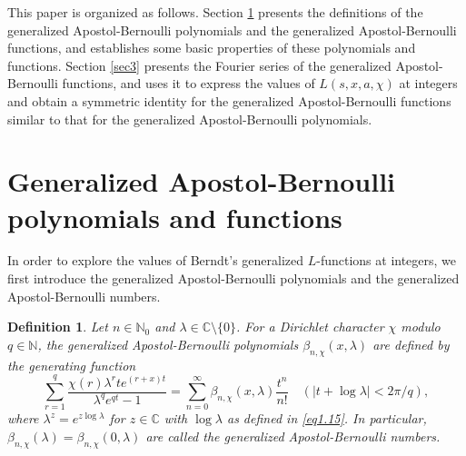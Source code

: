 \documentclass[reqno]{amsart}
\numberwithin{equation}{section}
\newtheorem{definition}[thm]{Definition}
\begin{document}
This paper is organized as follows. Section \ref{sec2} presents the definitions of the generalized Apostol-Bernoulli polynomials and the generalized Apostol-Bernoulli functions, and establishes some basic properties of these polynomials and functions. Section \ref{sec3} presents the Fourier series of the generalized Apostol-Bernoulli functions, and uses it to express the values of $L(s,x,a,\chi)$ at integers and obtain a symmetric identity for the generalized Apostol-Bernoulli functions similar to that for the generalized Apostol-Bernoulli polynomials.

\section{Generalized Apostol-Bernoulli polynomials and functions}\label{sec2}

In order to explore the values of Berndt's generalized $L$-functions at integers, we first introduce the generalized Apostol-Bernoulli polynomials and the generalized Apostol-Bernoulli numbers.

\begin{definition}\label{def2.1} Let $n\in\mathbb{N}_{0}$ and $\lambda\in\mathbb{C}\setminus\{0\}$. For a Dirichlet character $\chi$ modulo $q\in\mathbb{N}$, the generalized Apostol-Bernoulli polynomials $\beta_{n,\chi}(x,\lambda)$ are defined by the generating function
\begin{equation}\label{eq2.1}
\sum_{r=1}^{q}\frac{\chi(r)\lambda^{r}te^{(r+x)t}}{\lambda^{q}e^{qt}-1}=\sum_{n=0}^{\infty}\beta_{n,\chi}(x,\lambda)\frac{t^{n}}{n!}\quad(|t+\log\lambda|<2\pi/q),
\end{equation}
where $\lambda^{z}=e^{z\log\lambda}$ for $z\in\mathbb{C}$ with $\log\lambda$ as defined in \eqref{eq1.15}. In particular, $\beta_{n,\chi}(\lambda)=\beta_{n,\chi}(0,\lambda)$ are called the generalized Apostol-Bernoulli numbers.
\end{definition}
\end{document}
